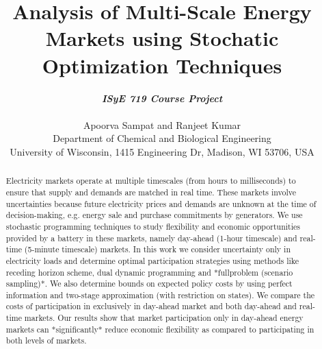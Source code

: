\documentclass[11pt,twoside]{article}
\begin{document}
\title{Analysis of Multi-Scale Energy Markets using Stochatic Optimization Techniques}

\author{\textbf{\textit{ISyE 719 Course Project}}\\ \\Apoorva Sampat and Ranjeet Kumar\\
 {\small Department of Chemical and Biological Engineering}\\
 {\small \;University of Wisconsin, 1415 Engineering Dr, Madison, WI 53706, USA}}
\date{}
\maketitle

\begin{abstract}
Electricity markets operate at multiple timescales (from hours to milliseconds) to ensure that supply and demands are matched in real time. These markets involve uncertainties because future electricity prices and demands are unknown at the time of decision-making, e.g. energy sale and purchase commitments by generators. We use stochastic programming techniques to study flexibility and economic opportunities provided by a battery in these markets, namely day-ahead (1-hour timescale) and real-time (5-minute timescale) markets. In this work we consider uncertainty only in electricity loads and determine optimal participation strategies using methods like receding horizon scheme, dual dynamic programming and *fullproblem (scenario sampling)*. We also determine bounds on expected policy costs by using perfect information and two-stage approximation (with restriction on states). We compare the costs of participation in exclusively in day-ahead market and both day-ahead and real-time markets. Our results show that market participation only in day-ahead energy markets can *significantly* reduce economic flexibility as compared to participating in both levels of markets.
\end{abstract}
\end{document}
